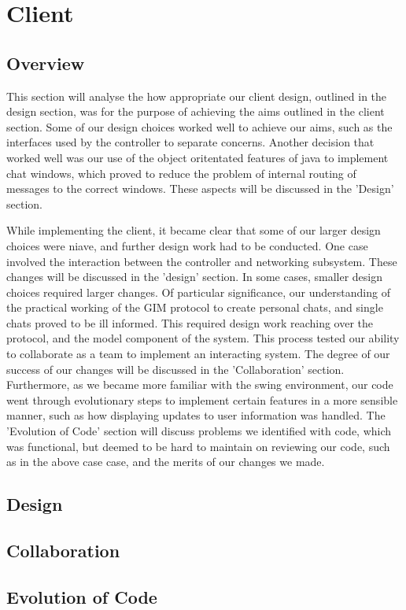 \section{Client}

\subsection{Overview}

This section will analyse the how appropriate our client design, outlined in the design section, was for the purpose of achieving the aims outlined in the client section. Some of our design choices worked well to achieve our aims, such as the interfaces used by the controller to separate concerns. Another decision that worked well was our use of the object oritentated features of java to implement chat windows, which proved to reduce the problem of internal routing of messages to the correct windows. These aspects will be discussed in the 'Design' section.

While implementing the client, it became clear that some of our larger design choices were niave, and further design work had to be conducted. One case involved the interaction between the controller and networking subsystem. These changes will be discussed in the 'design' section. In some cases, smaller design choices required larger changes. Of particular significance, our understanding of the practical working of the GIM protocol to create personal chats, and single chats proved to be ill informed. This required design work reaching over the protocol, and the model component of the system. This process tested our ability to collaborate as a team to implement an interacting system. The degree of our success of our changes will be discussed in the 'Collaboration' section. Furthermore, as we became more familiar with the swing environment, our code went through evolutionary steps to implement certain features in a more sensible manner, such as how displaying updates to user information was handled. The 'Evolution of Code' section will discuss problems we identified with code, which was functional,  but deemed to be hard to maintain on reviewing our code, such as in the above case case, and the merits of our changes we made. 

\subsection{Design}

\subsection{Collaboration}

\subsection{Evolution of Code}
